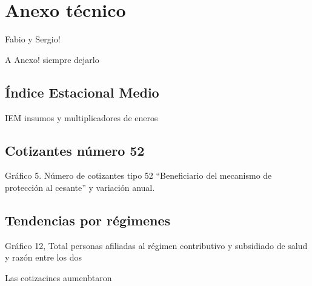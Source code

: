 \section{Anexo técnico}
Fabio y Sergio! 

A Anexo! siempre dejarlo
\subsection{Índice Estacional Medio}
IEM insumos y multiplicadores de eneros 
\subsection{Cotizantes número 52}
Gráfico 5. Número de cotizantes tipo 52
“Beneficiario del mecanismo de protección al cesante” y
variación anual.

\subsection{Tendencias por régimenes}
Gráfico 12, Total personas afiliadas al régimen contributivo
y subsidiado de salud y razón entre los dos





Las cotizacines aumenbtaron 